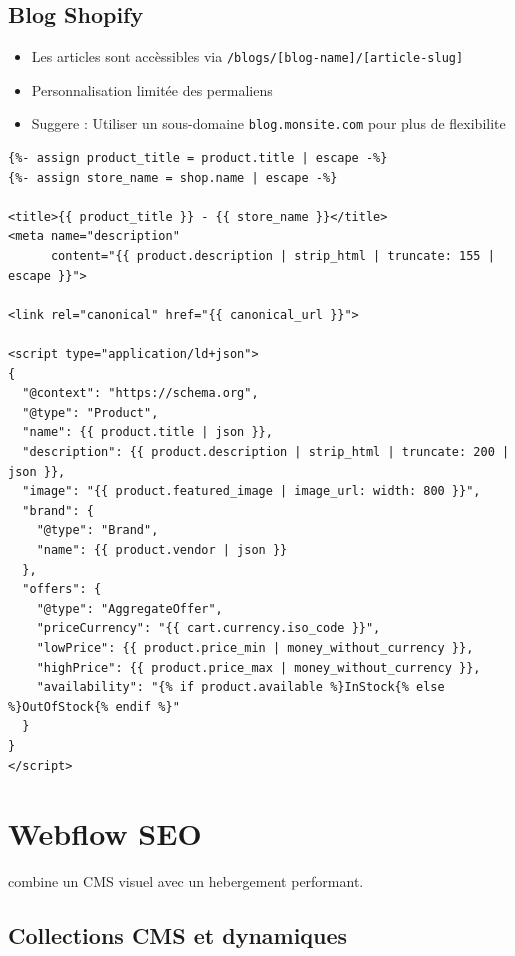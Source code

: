 \subsection{Blog Shopify}

\begin{itemize}
    \item Les articles sont accèssibles via \texttt{/blogs/[blog-name]/[article-slug]}
    \item Personnalisation limitée des permaliens
    \item Suggere : Utiliser un sous-domaine \texttt{blog.monsite.com} pour plus de flexibilite
\end{itemize}

\begin{lstlisting}[style=htmlcode,caption={Template Liquid Shopify optimisé pour SEO}]
{%- assign product_title = product.title | escape -%}
{%- assign store_name = shop.name | escape -%}

<title>{{ product_title }} - {{ store_name }}</title>
<meta name="description"
      content="{{ product.description | strip_html | truncate: 155 | escape }}">

<link rel="canonical" href="{{ canonical_url }}">

<script type="application/ld+json">
{
  "@context": "https://schema.org",
  "@type": "Product",
  "name": {{ product.title | json }},
  "description": {{ product.description | strip_html | truncate: 200 | json }},
  "image": "{{ product.featured_image | image_url: width: 800 }}",
  "brand": {
    "@type": "Brand",
    "name": {{ product.vendor | json }}
  },
  "offers": {
    "@type": "AggregateOffer",
    "priceCurrency": "{{ cart.currency.iso_code }}",
    "lowPrice": {{ product.price_min | money_without_currency }},
    "highPrice": {{ product.price_max | money_without_currency }},
    "availability": "{% if product.available %}InStock{% else %}OutOfStock{% endif %}"
  }
}
</script>
\end{lstlisting}

\section{Webflow SEO}

 combine un CMS visuel avec un hebergement performant.

\subsection{Collections CMS et dynamiques}

